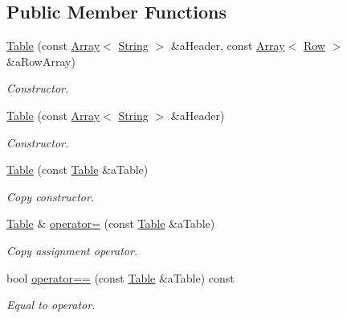 \subsection*{Public Member Functions}
\begin{DoxyCompactItemize}
\item 
\hyperlink{classlibrary_1_1core_1_1ctnr_1_1_table_a5b11121caa4288c3da642af7c6a5a632}{Table} (const \hyperlink{classlibrary_1_1core_1_1ctnr_1_1_array}{Array}$<$ \hyperlink{classlibrary_1_1core_1_1types_1_1_string}{String} $>$ \&a\+Header, const \hyperlink{classlibrary_1_1core_1_1ctnr_1_1_array}{Array}$<$ \hyperlink{classlibrary_1_1core_1_1ctnr_1_1table_1_1_row}{Row} $>$ \&a\+Row\+Array)
\begin{DoxyCompactList}\small\item\em Constructor. \end{DoxyCompactList}\item 
\hyperlink{classlibrary_1_1core_1_1ctnr_1_1_table_a95e14e9c464aa1881b86cefb7770aa62}{Table} (const \hyperlink{classlibrary_1_1core_1_1ctnr_1_1_array}{Array}$<$ \hyperlink{classlibrary_1_1core_1_1types_1_1_string}{String} $>$ \&a\+Header)
\begin{DoxyCompactList}\small\item\em Constructor. \end{DoxyCompactList}\item 
\hyperlink{classlibrary_1_1core_1_1ctnr_1_1_table_afaaf450a1a4949b48b6290460137921e}{Table} (const \hyperlink{classlibrary_1_1core_1_1ctnr_1_1_table}{Table} \&a\+Table)
\begin{DoxyCompactList}\small\item\em Copy constructor. \end{DoxyCompactList}\item 
\hyperlink{classlibrary_1_1core_1_1ctnr_1_1_table}{Table} \& \hyperlink{classlibrary_1_1core_1_1ctnr_1_1_table_a77d62f9695b47e5d6b57554ccbaefc9a}{operator=} (const \hyperlink{classlibrary_1_1core_1_1ctnr_1_1_table}{Table} \&a\+Table)
\begin{DoxyCompactList}\small\item\em Copy assignment operator. \end{DoxyCompactList}\item 
bool \hyperlink{classlibrary_1_1core_1_1ctnr_1_1_table_ad74691bcfc56002a7eb5fc76f2a7cb9d}{operator==} (const \hyperlink{classlibrary_1_1core_1_1ctnr_1_1_table}{Table} \&a\+Table) const
\begin{DoxyCompactList}\small\item\em Equal to operator. \end{DoxyCompactList}\item 

\end{DoxyCompactItemize}
